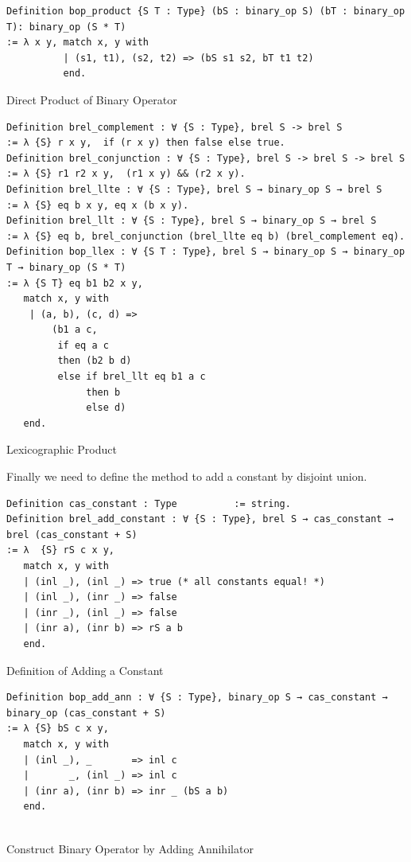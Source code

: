\documentclass[a4paper,12pt,twoside,openright]{report}
\begin{document}
\begin{listing}[H]
\begin{verbatim}
Definition bop_product {S T : Type} (bS : binary_op S) (bT : binary_op T): binary_op (S * T) 
:= λ x y, match x, y with
          | (s1, t1), (s2, t2) => (bS s1 s2, bT t1 t2) 
          end.
\end{verbatim}
\caption{Direct Product of Binary Operator} 
\label{coq:def:direct_product}
\end{listing}

\begin{listing}[H]
\begin{verbatim}
Definition brel_complement : ∀ {S : Type}, brel S -> brel S 
:= λ {S} r x y,  if (r x y) then false else true.    
Definition brel_conjunction : ∀ {S : Type}, brel S -> brel S -> brel S 
:= λ {S} r1 r2 x y,  (r1 x y) && (r2 x y).    
Definition brel_llte : ∀ {S : Type}, brel S → binary_op S → brel S 
:= λ {S} eq b x y, eq x (b x y).    
Definition brel_llt : ∀ {S : Type}, brel S → binary_op S → brel S 
:= λ {S} eq b, brel_conjunction (brel_llte eq b) (brel_complement eq).  
Definition bop_llex : ∀ {S T : Type}, brel S → binary_op S → binary_op T → binary_op (S * T) 
:= λ {S T} eq b1 b2 x y,  
   match x, y with
    | (a, b), (c, d) => 
        (b1 a c, 
         if eq a c 
         then (b2 b d)
         else if brel_llt eq b1 a c 
              then b 
              else d)
   end.
\end{verbatim}
\caption{Lexicographic Product} 
\label{coq:def:lexicographic_product}
\end{listing}

Finally we need to define the method to add a constant by disjoint union.

\begin{listing}[H]
\begin{verbatim}
Definition cas_constant : Type          := string.   
Definition brel_add_constant : ∀ {S : Type}, brel S → cas_constant → brel (cas_constant + S)
:= λ  {S} rS c x y, 
   match x, y with
   | (inl _), (inl _) => true (* all constants equal! *) 
   | (inl _), (inr _) => false 
   | (inr _), (inl _) => false 
   | (inr a), (inr b) => rS a b 
   end.

\end{verbatim}
\caption{Definition of Adding a Constant} 
\label{coq:def:add_const}
\end{listing}


\begin{listing}[H]
\begin{verbatim}
Definition bop_add_ann : ∀ {S : Type}, binary_op S → cas_constant → binary_op (cas_constant + S)
:= λ {S} bS c x y, 
   match x, y with
   | (inl _), _       => inl c
   |       _, (inl _) => inl c
   | (inr a), (inr b) => inr _ (bS a b)
   end.
   
\end{verbatim}
\caption{Construct Binary Operator by Adding Annihilator} 
\label{coq:def:add_const_ann}
\end{listing}
\end{document}
